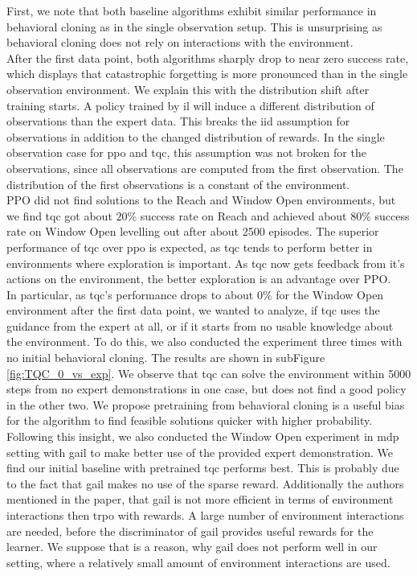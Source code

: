 First, we note that both baseline algorithms exhibit similar performance in behavioral cloning as in the single 
observation setup. This is unsurprising as behavioral cloning does not rely on interactions with the environment. \\

After the first data point, both algorithms sharply drop to near zero success rate, which displays that catastrophic forgetting is more 
pronounced than in the single observation environment. We explain this with the distribution shift after training starts. A policy trained by \ac{il} 
will induce a different distribution of observations than the expert data. This breaks the \ac{iid} assumption for observations in addition to the changed distribution of rewards. 
In the single observation case for \ac{ppo} and \ac{tqc}, this assumption was not broken for the observations, 
since all observations are computed from the first observation. The distribution of the first observations is a constant of the environment.\\

PPO did not find solutions to the Reach and Window Open environments, 
but we find \ac{tqc} got about $20 \%$ success rate on Reach and achieved about $80 \%$ success rate on Window Open levelling out after about 2500 episodes. 
The superior performance of \ac{tqc} over \ac{ppo} is expected, as \ac{tqc} tends to perform better in environments where exploration is important. As \ac{tqc} now gets 
feedback from it's actions on the environment, the better exploration is an advantage over PPO.\\ 

In particular, as \ac{tqc}'s performance drops to about $0 \%$ for the Window Open 
environment after the first data point, we wanted to analyze, if \ac{tqc} uses the guidance from the expert at all, or if it starts from 
no usable knowledge about the environment. To do this, we also conducted the experiment three times with no initial behavioral cloning. The results are shown in 
subFigure \ref{fig:TQC_0_vs_exp}. We observe that \ac{tqc} can solve the environment within 5000 steps from no expert demonstrations in one case, but does not find a good policy in the other two. 
We propose pretraining from behavioral cloning is a useful bias for the algorithm to find feasible solutions quicker with higher probability.\\ 

Following this insight, 
we also conducted the Window Open experiment in \ac{mdp} setting with \ac{gail} to make better use of the provided expert demonstration. We find our initial 
baseline with pretrained \ac{tqc} performs best. This is probably due to the fact that \ac{gail} makes no use of the sparse reward. Additionally 
the authors mentioned in the paper, that \ac{gail} is not more efficient in terms of environment interactions then \ac{trpo} with rewards. A large number of 
environment interactions are needed, before the discriminator of \ac{gail} provides useful rewards for the learner. We suppose that is a reason, why \ac{gail} does not perform 
well in our setting, where a relatively small amount of environment interactions are used.\\ 

